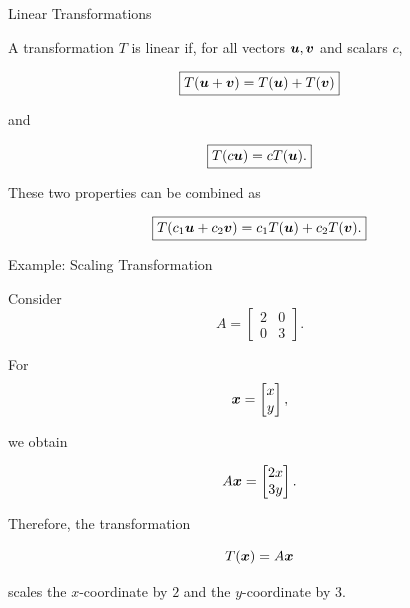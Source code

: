 
\begin{frame}{Linear Transformations}

A transformation $T$ is linear if, for all vectors $\bm{u},\bm{v}$
and scalars $c$,

\[
\boxed{
T(\bm{u}+\bm{v})
=
T(\bm{u})+T(\bm{v})
}
\]

and

\[
\boxed{
T(c\bm{u})
=
cT(\bm{u}).
}
\]

These two properties can be combined as

\[
\boxed{
T(c_1\bm{u}+c_2\bm{v})
=
c_1T(\bm{u})+c_2T(\bm{v}).
}
\]

\end{frame}



\begin{frame}{Example: Scaling Transformation}

Consider
\vspace{-0.1cm}
\[
A=
\begin{bmatrix}
2&0\\
0&3
\end{bmatrix}.
\]

For
\vspace{-0.1cm}
\[
\bm{x}
=
\begin{bmatrix}
x\\
y
\end{bmatrix},
\]

we obtain

\[
A\bm{x}
=
\begin{bmatrix}
2x\\
3y
\end{bmatrix}.
\]

Therefore, the transformation

\[
T(\bm{x})=A\bm{x}
\]

scales the $x$-coordinate by $2$ and the $y$-coordinate
by $3$.

\end{frame}



